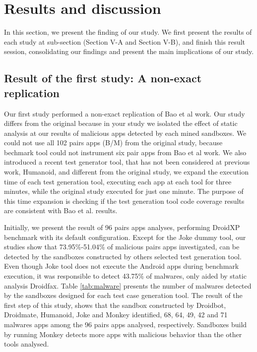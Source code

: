 \section{Results and discussion}

In this section, we present the finding of our study. We first present the results of each study at sub-section (Section V-A and Section V-B), and finish this result session, consolidating our findings and present the main implications of our study.

\subsection{Result of the first study: A non-exact replication}

Our first study performed a non-exact replication of Bao et al work. Our study differs from the original because in your study we isolated the effect of static analysis at our results of malicious apps detected by each mined sandboxes. We could not use all 102 pairs apps (B/M) from the original study, because bechmark tool could not instrument six pair apps from Bao et al work. We also introduced a recent test generator tool, that has not been considered at previous work, Humanoid, and different from the original study, we expand the execution time of each test generation tool, executing each app at each tool for three minutes, while the original study executed for just one minute. The purpose of this time expansion is checking if the test generation tool code coverage results are consistent with Bao et al. results.

Initially, we present the result of 96 pairs apps analyses, performing DroidXP benchmark with its default configuration. Except for the Joke dummy tool, our studies show that 73.95\%-51.04\% of malicious pairs apps investigated, can be detected by the sandboxes constructed by others selected test generation tool. Even though Joke tool does not execute the Android apps during benchmark execution, it was responsible to detect 43.75\% of malwares, only aided by static analysis Droidfax. Table \ref{tab:malware} presents the number of malwares detected by the sandboxes designed for each test case generation tool. The result of the first step of this study, shows that the sandbox constructed by Droidbot, Droidmate, Humanoid, Joke and Monkey identified, 68, 64, 49, 42 and 71 malwares apps among the 96 pairs apps analysed, respectively. Sandboxes build by running Monkey detects more apps with malicious behavior than the other tools analysed.

